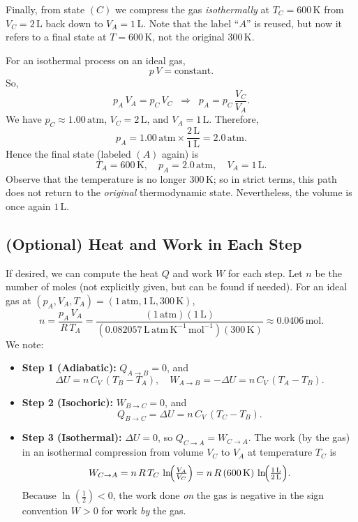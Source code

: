 \documentclass[12pt]{article}
\theoremstyle{definition} %
\theoremstyle{plain} %
\begin{document}
Finally, from state $(C)$ we compress the gas \emph{isothermally} at $T_C=600\,\mathrm{K}$ from $V_C=2\,\mathrm{L}$ back down to $V_A=1\,\mathrm{L}$. Note that the label ``$A$'' is reused, but now it refers to a final state at $T=600\,\mathrm{K}$, not the original $300\,\mathrm{K}$.

For an isothermal process on an ideal gas,
\[
 p\,V = \text{constant}.
\]
So,
\[
 p_A\,V_A = p_C\,V_C
 \;\;\Longrightarrow\;\;
 p_A = p_C \,\frac{V_C}{V_A}.
\]
We have $p_C \approx 1.00\,\mathrm{atm}$, $V_C=2\,\mathrm{L}$, and $V_A=1\,\mathrm{L}$. Therefore,
\[
 p_A = 1.00\,\mathrm{atm} \times \frac{2\,\mathrm{L}}{1\,\mathrm{L}}
 = 2.0\,\mathrm{atm}.
\]
Hence the final state (labeled $(A)$ again) is
\[
 \boxed{
   T_A = 600\,\mathrm{K},
   \quad p_A = 2.0\,\mathrm{atm},
   \quad V_A = 1\,\mathrm{L}.
 }
\]
Observe that the temperature is no longer $300\,\mathrm{K}$; so in strict terms, this path does not return to the \emph{original} thermodynamic state. Nevertheless, the volume is once again $1\,\mathrm{L}$.

\subsection*{(Optional) Heat and Work in Each Step}

If desired, we can compute the heat $Q$ and work $W$ for each step. Let $n$ be the number of moles (not explicitly given, but can be found if needed). For an ideal gas at $(p_A,V_A,T_A)=(1\,\mathrm{atm},1\,\mathrm{L},300\,\mathrm{K})$,
\[
 n 
 = \frac{p_A\,V_A}{R\,T_A}
 = \frac{(1\,\mathrm{atm})(1\,\mathrm{L})}{(0.082057\,\mathrm{L\,atm\,K^{-1}\,mol^{-1}})(300\,\mathrm{K})}
 \approx 0.0406\,\mathrm{mol}.
\]
We note:

\begin{itemize}
\item \textbf{Step 1 (Adiabatic):} $Q_{A\to B} = 0$, 
  and 
  \[
    \Delta U = n\,C_V\,(T_B - T_A), 
    \quad
    W_{A\to B} = -\Delta U 
    = n\,C_V\,(T_A - T_B).
  \]
\item \textbf{Step 2 (Isochoric):} $W_{B\to C} = 0$, 
  and
  \[
    Q_{B\to C} = \Delta U 
    = n\,C_V\,(T_C - T_B).
  \]
\item \textbf{Step 3 (Isothermal):} $\Delta U = 0$, so $Q_{C\to A} = W_{C\to A}$. The work (by the gas) in an isothermal compression from volume $V_C$ to $V_A$ at temperature $T_C$ is
  \[
    W_{C\to A} 
    = n\,R\,T_C\,\ln\!\Bigl(\tfrac{V_A}{V_C}\Bigr)
    = n\,R\,(600\,\mathrm{K})\,\ln\!\Bigl(\tfrac{1\,\mathrm{L}}{2\,\mathrm{L}}\Bigr).
  \]
  Because $\ln(\tfrac{1}{2})<0$, the work done \emph{on} the gas is negative in the sign convention $W>0$ for work \emph{by} the gas. 
\end{itemize}
\end{document}
